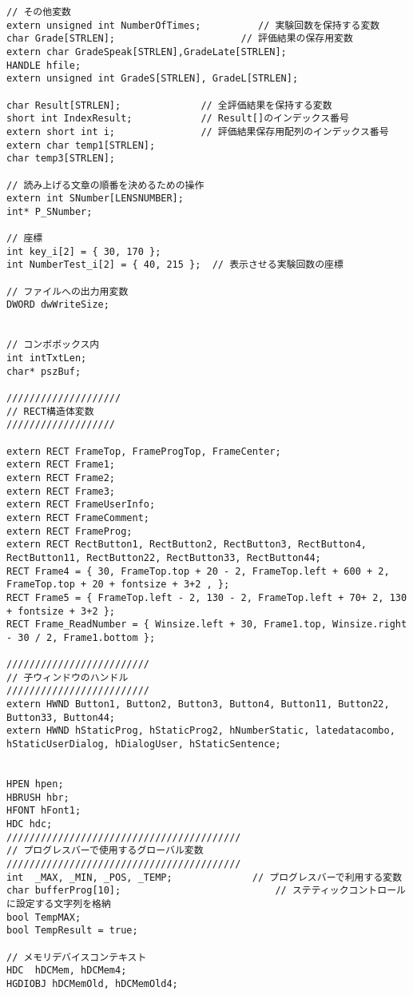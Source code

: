 \begin{lstlisting}[caption=main.cpp]
// その他変数
extern unsigned int NumberOfTimes;          // 実験回数を保持する変数
char Grade[STRLEN];                      // 評価結果の保存用変数
extern char GradeSpeak[STRLEN],GradeLate[STRLEN];
HANDLE hfile;
extern unsigned int GradeS[STRLEN], GradeL[STRLEN];

char Result[STRLEN];              // 全評価結果を保持する変数
short int IndexResult;            // Result[]のインデックス番号 
extern short int i;               // 評価結果保存用配列のインデックス番号
extern char temp1[STRLEN];
char temp3[STRLEN];

// 読み上げる文章の順番を決めるための操作
extern int SNumber[LENSNUMBER];
int* P_SNumber;

// 座標
int key_i[2] = { 30, 170 };         
int NumberTest_i[2] = { 40, 215 };  // 表示させる実験回数の座標

// ファイルへの出力用変数
DWORD dwWriteSize;


// コンボボックス内
int intTxtLen;
char* pszBuf;

////////////////////
// RECT構造体変数
///////////////////
	
extern RECT FrameTop, FrameProgTop, FrameCenter;
extern RECT Frame1;
extern RECT Frame2;
extern RECT Frame3;
extern RECT FrameUserInfo;
extern RECT FrameComment;
extern RECT FrameProg;
extern RECT RectButton1, RectButton2, RectButton3, RectButton4, RectButton11, RectButton22, RectButton33, RectButton44;
RECT Frame4 = { 30, FrameTop.top + 20 - 2, FrameTop.left + 600 + 2, FrameTop.top + 20 + fontsize + 3+2 , };
RECT Frame5 = { FrameTop.left - 2, 130 - 2, FrameTop.left + 70+ 2, 130 + fontsize + 3+2 };
RECT Frame_ReadNumber = { Winsize.left + 30, Frame1.top, Winsize.right - 30 / 2, Frame1.bottom };

/////////////////////////
// 子ウィンドウのハンドル
/////////////////////////
extern HWND Button1, Button2, Button3, Button4, Button11, Button22, Button33, Button44;
extern HWND hStaticProg, hStaticProg2, hNumberStatic, latedatacombo, hStaticUserDialog, hDialogUser, hStaticSentence;


HPEN hpen;
HBRUSH hbr;
HFONT hFont1;
HDC hdc;
/////////////////////////////////////////
// プログレスバーで使用するグローバル変数
/////////////////////////////////////////
int  _MAX, _MIN, _POS, _TEMP;              // プログレスバーで利用する変数
char bufferProg[10];                           // ステティックコントロールに設定する文字列を格納
bool TempMAX;
bool TempResult = true;

// メモリデバイスコンテキスト
HDC  hDCMem, hDCMem4;
HGDIOBJ hDCMemOld, hDCMemOld4;


\end{lstlisting}
